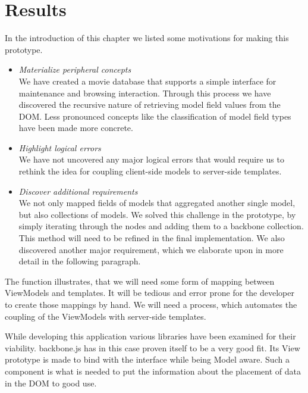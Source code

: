 \documentclass[thesis.tex]{subfiles}
\begin{document}
\section{Results}
\label{sec:first-results}
In the introduction of this chapter we listed some motivations for making
this prototype.

\begin{itemize}
	\item \emph{Materialize peripheral concepts}\\
	We have created a movie database that supports a simple interface
	for maintenance and browsing interaction.
	Through this process we have discovered the recursive nature of retrieving
	model field values from the DOM.
	Less pronounced concepts like the classification of model field types have 
	been made more concrete.
	\item \emph{Highlight logical errors}\\
	We have not uncovered any major logical errors that would require us to
	rethink the idea for coupling client-side models to server-side templates.
	\item \emph{Discover additional requirements}\\
	We not only mapped fields of models that aggregated another single model,
	but also collections of models. We solved this challenge in the prototype,
	by simply iterating through the nodes and adding them to
	a backbone collection. This method will need to be refined in the final
	implementation.
	We also discovered another major requirement, which we elaborate upon in more
	detail in the following paragraph.
\end{itemize}

The function  illustrates, that we will need some form
of mapping between ViewModels and templates.
It will be tedious and error prone for the developer to create those mappings
by hand. We will need a process, which automates the coupling of the ViewModels
with server-side templates.

While developing this application various libraries have been examined for their
viability. backbone.js has in this case proven itself to be a very good fit.
Its View prototype is made to bind with the interface while being Model aware.
Such a component is what is needed to put the information about
the placement of data in the DOM to good use.
\end{document}

